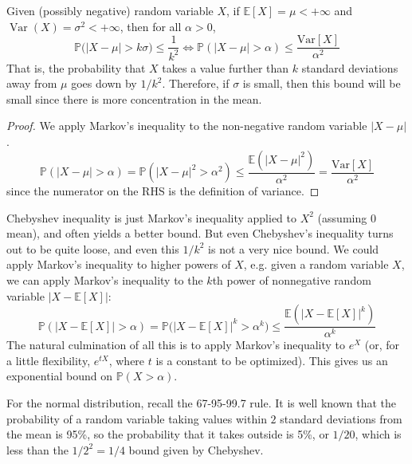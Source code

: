 \documentclass{article}
\DeclareMathOperator{\Var}{Var}
\begin{document}
    \begin{theorem}
      Given (possibly negative) random variable $X$, if $\mathbb{E}[X] = \mu < +\infty$ and $\Var(X) = \sigma^2 < +\infty$, then for all $\alpha > 0$, 
      \begin{equation}
        \mathbb{P} \big( |X - \mu| > k \sigma \big) \leq \frac{1}{k^2} \iff \mathbb{P}(|X - \mu| > \alpha) \leq \frac{\mathrm{Var}[X]}{\alpha^2}
      \end{equation}
      That is, the probability that $X$ takes a value further than $k$ standard deviations away from $\mu$ goes down by $1/k^2$. Therefore, if $\sigma$ is small, then this bound will be small since there is more concentration in the mean. 
    \end{theorem}
    \begin{proof}
      We apply Markov's inequality to the non-negative random variable $|X - \mu|$. 
      \begin{equation}
        \mathbb{P}(|X - \mu| > \alpha) = \mathbb{P}(|X - \mu|^2 > \alpha^2) \leq \frac{\mathbb{E}(|X - \mu|^2)}{\alpha^2} = \frac{\mathrm{Var}[X]}{\alpha^2}
      \end{equation}
      since the numerator on the RHS is the definition of variance. 
    \end{proof}

    Chebyshev inequality is just Markov's inequality applied to $X^2$ (assuming $0$ mean), and often yields a better bound. But even Chebyshev's inequality turns out to be quite loose, and even this $1/k^2$ is not a very nice bound. We could apply Markov's inequality to higher powers of $X$, e.g. given a random variable $X$, we can apply Markov's inequality to the $k$th power of nonnegative random variable $|X - \mathbb{E}[X]|$: 
    \begin{equation}
      \mathbb{P} (|X - \mathbb{E}[X] | > \alpha) = \mathbb{P}\big( |X - \mathbb{E}[X] |^k > \alpha^k \big) \leq \frac{\mathbb{E}( |X - \mathbb{E}[X] |^k )}{\alpha^k}
    \end{equation}
    The natural culmination of all this is to apply Markov's inequality to $e^X$ (or, for a little flexibility, $e^{t X}$, where $t$ is a constant to be optimized). This gives us an exponential bound on $\mathbb{P}(X > \alpha)$. 

    \begin{example}[Gaussian]
      For the normal distribution, recall the 67-95-99.7 rule. It is well known that the probability of a random variable taking values within $2$ standard deviations from the mean is 95\%, so the probability that it takes outside is 5\%, or $1/20$, which is less than the $1/2^2 = 1/4$ bound given by Chebyshev. 
    \end{example}
\end{document}
